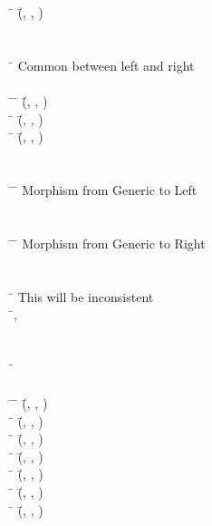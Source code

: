 \documentclass{AISB2008}
\begin{document}
\begin{listing}[H]
{\begin{hetcasl}
\> \Ax{\bullet} \= (\=, , ) \Ax{=} \\
\\
\\
\SPEC \= \Ax{=} \KW{\%} Common between left and right\\
\> \\
\THEN \=\Ax{\bullet} \= (\=, , ) \Ax{=} \\
\> \Ax{\bullet} \= (\=, , ) \Ax{=} \\
\> \Ax{\bullet} \= (\=, , ) \Ax{=} \\
\\
\\
\VIEW \= \Ax{:} \=   \KW{\%} Morphism from Generic to Left\\
\\
\\
\VIEW \= \Ax{:} \=   \KW{\%} Morphism from Generic to Right\\
\\
\\
\SPEC \= \Ax{=} \KW{\%} This will be inconsistent\\
\>  \=, \\
\\
\\
\SPEC \= \Ax{=}\\
\> \\
\THEN \=\Ax{\bullet} \= (\=, , ) \Ax{=} \\
\> \Ax{\bullet} \= (\=, , ) \Ax{=} \\
\> \Ax{\bullet} \= (\=, , ) \Ax{=} \\
\> \Ax{\bullet} \= (\=, , ) \Ax{=} \\
\> \Ax{\bullet} \= (\=, , ) \Ax{=} \\
\> \Ax{\bullet} \= (\=, , ) \Ax{=} \\
\> \Ax{\bullet} \= (\=, , ) \Ax{=} \\
\\

\end{hetcasl}}
\end{listing}
\end{document}
